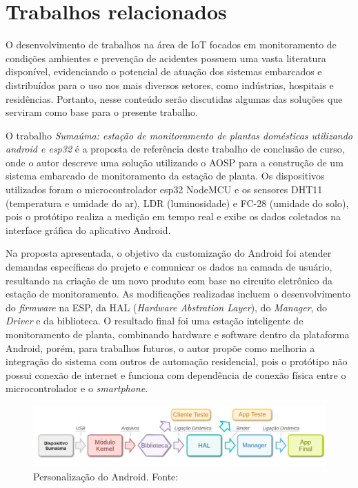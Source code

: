 \section{Trabalhos relacionados}

O desenvolvimento de trabalhos na área de IoT focados em monitoramento de condições ambientes e prevenção de acidentes 
possuem uma vasta literatura disponível, evidenciando o potencial de atuação dos sistemas embarcados e distribuídos para 
o uso nos mais diversos setores, como indústrias, hospitais e residências. Portanto, nesse conteúdo  serão discutidas 
algumas das soluções que serviram como base para o presente trabalho. 

O trabalho \textit{Sumaúma: estação de monitoramento de plantas domésticas utilizando android e esp32} \cite{ufam-aosp-sumama} é a proposta de 
referência deste trabalho de conclusão de curso, onde o autor descreve uma solução utilizando o AOSP para a construção de um 
sistema embarcado de monitoramento da estação de planta. Os dispositivos utilizados foram o microcontrolador esp32 NodeMCU e os sensores DHT11 (temperatura e umidade do ar), LDR 
(luminosidade) e FC-28 (umidade do solo), pois o protótipo realiza a medição em tempo real e exibe os dados coletados na interface gráfica do aplicativo Android. 

Na proposta apresentada, o objetivo da customização do Android foi atender demandas específicas do projeto e comunicar os dados na camada de usuário, resultando na criação de um novo produto com base no 
circuito eletrônico da estação de monitoramento.  As modificações realizadas incluem o desenvolvimento do \textit{firmware} na ESP, 
da HAL (\textit{Hardware Abstration Layer}), do \textit{Manager}, do \textit{Driver} e da biblioteca. O resultado final foi uma estação inteligente de monitoramento 
de planta, combinando hardware e software dentro da plataforma Android, porém, para trabalhos futuros, o autor propõe como melhoria a integração do sistema 
com outros de automação residencial, pois o protótipo não possui conexão de internet e funciona com dependência de conexão física 
entre o microcontrolador e o \textit{smartphone}.

\begin{figure}[ht]
    \centering
    \includegraphics[width=.87\textwidth]{img/smartlamp-overview.png}
    \caption{Personalização do Android. Fonte:\cite{ufam-aosp-sumama}}\label{figSumauma}
\end{figure}


